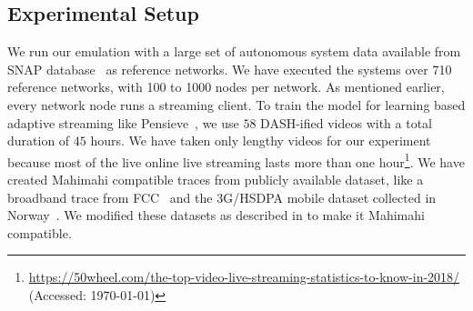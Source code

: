 \subsection{Experimental Setup}
We run our emulation with a large set of autonomous system data available from SNAP database~\cite{ASDataSet} as reference networks. We have executed the systems over 710 reference networks, with 100 to 1000 nodes per network. As mentioned earlier, every network node runs a streaming client. To train the model for learning based adaptive streaming like Pensieve~\cite{Pensieve}, we use $58$ DASH-ified videos with a total duration of $45$ hours. We have taken only lengthy videos for our experiment because most of the live online live streaming lasts more than one hour\footnote{\url{https://50wheel.com/the-top-video-live-streaming-statistics-to-know-in-2018/} (Accessed: \today)}. We have created Mahimahi compatible traces from publicly available dataset, like a broadband trace from FCC~\cite{dataset-fcc} and the 3G/HSDPA mobile dataset collected in Norway~\cite{dataset-norway}. We modified these datasets as described in \cite{Pensieve} to make it Mahimahi compatible.

